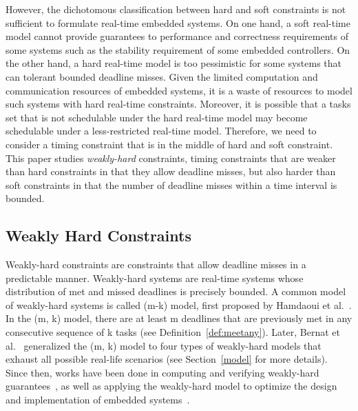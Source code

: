 However, the dichotomous classification between hard and soft constraints is not sufficient to formulate real-time embedded systems. On one hand, a soft real-time model cannot provide guarantees to performance and correctness requirements of some systems such as the stability requirement of some embedded controllers. On the other hand, a hard real-time model is too pessimistic for some systems that can tolerant bounded deadline misses. Given the limited computation and communication resources of embedded systems, it is a waste of resources to model such systems with hard real-time constraints. Moreover, it is possible that a tasks set that is not schedulable under the hard real-time model may become schedulable under a less-restricted real-time model. Therefore, we need to consider a timing constraint that is in the middle of hard and soft constraint. This paper studies \emph{weakly-hard} constraints, timing constraints that are weaker than hard constraints in that they allow deadline misses, but also harder than soft constraints in that the number of deadline misses within a time interval is bounded. 

\subsection{Weakly Hard Constraints}
Weakly-hard constraints are constraints that allow deadline misses in a predictable manner. Weakly-hard systems are real-time systems whose distribution of met and missed deadlines is precisely bounded. A common model of weakly-hard systems is called (m-k) model, first proposed by Hamdaoui et al.~\cite{hamdaoui1995dynamic}. In the (m, k) model, there are at least m deadlines that are previously met in any consecutive sequence of k tasks (see Definition~\ref{def:meetany}). Later, Bernat et al.~\cite{bernat2001weakly} generalized the (m, k) model to four types of weakly-hard models that exhaust all possible real-life scenarios (see Section~\ref{model} for more details). Since then, works have been done in computing and verifying weakly-hard guarantees~\cite{bernat2001weakly, broster2002weakly, hammadeh2014extending,  sun2017weakly, ahrendts2018verifying, hammadeh2018weakly, huang2019formal, huang2020saw, pazzagliageneralized, choi2019job}, as well as applying the weakly-hard model to optimize the design and implementation of embedded systems~\cite{liang2019security, liang2020leveraging, maggio2020control}.

